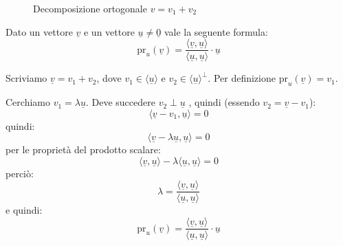 \documentclass[
  a4paper,
]{article}
\begin{document}
\begin{figure}[ht]
\centering
{}
\caption{Decomposizione ortogonale $v=v_1+v_2$}
\end{figure}

\begin{propositionbox}
Dato un vettore \(\underline{v}\) e un vettore
\(\underline{u} \neq \underline{0}\) vale la seguente formula: \[
\text{pr}_u(\underline{v}) = \frac{\langle \underline{v}, \underline{u} \rangle}{\langle \underline{u}, \underline{u} \rangle} \cdot \underline{u}
\]
\end{propositionbox}

\begin{proofbox}
Scriviamo \(\underline{v} = v_1 + v_2\), dove
\(v_1 \in \langle \underline{u} \rangle\) e
\(v_2 \in \langle \underline{u} \rangle^{\perp}\). Per definizione
\(\text{pr}_u(\underline{v}) = v_1\).

Cerchiamo \(v_1 = \lambda\underline{u}\). Deve succedere
\(v_2 \perp \underline{u}\) , quindi (essendo
\(v_2 = \underline{v} - v_1\)): \[
\langle \underline{v} - v_1, \underline{u} \rangle = 0
\] quindi: \[
\langle \underline{v} - \lambda \underline{u}, \underline{u} \rangle = 0
\] per le proprietà del prodotto scalare: \[
\langle \underline{v} , \underline{u} \rangle - \lambda\langle  \underline{u}, \underline{u} \rangle = 0
\] perciò: \[
\lambda = \frac{\langle \underline{v} , \underline{u} \rangle}{\langle \underline{u} , \underline{u} \rangle}
\] e quindi: \[
\text{pr}_u(\underline{v}) =  \frac{\langle \underline{v} , \underline{u} \rangle}{\langle \underline{u} , \underline{u} \rangle} \cdot \underline{u}
\]
\end{proofbox}
\end{document}
